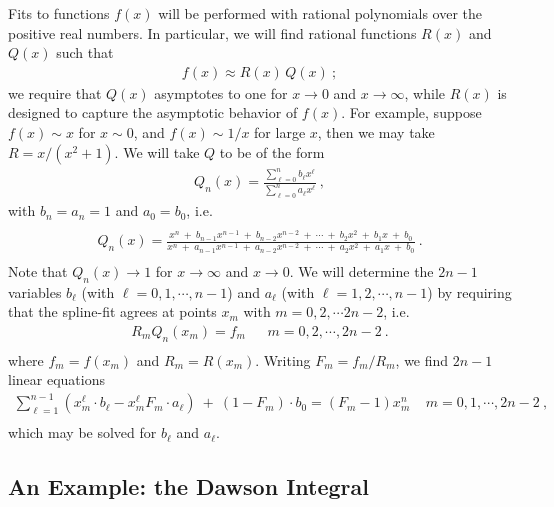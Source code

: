 \documentclass[preprint,12pt,eqsecnum,nofootinbib,amsmath,amssymb]{revtex4}
\begin{document}
Fits to functions $f(x)$ will be performed with rational 
polynomials over the positive real numbers. In particular, 
we will find rational functions $R(x)$ and $Q(x)$ such that
\begin{eqnarray}
  f(x) \approx R(x) \, Q(x) \ ;
\end{eqnarray}
we require that $Q(x)$ asymptotes to one for $x \to 0$ 
and $x\to\infty$, while $R(x)$ is designed to capture 
the asymptotic behavior of $f(x)$. For example, suppose 
$f(x) \sim x$ for $x \sim 0$, and $f(x) \sim 1/x$  for 
large $x$, then we may take  $R=x/(x^2 +1)$. We will take 
$Q$ to be of the form
\begin{eqnarray}
  Q_n(x) = \frac{\sum_{\ell=0}^n b_\ell x^\ell}
  {\sum_{\ell=0}^n a_\ell x^\ell} \ ,
\end{eqnarray}
with $b_n=a_n=1$ and $a_0=b_0$, i.e.
\begin{eqnarray}
\\ \nonumber
  Q_n(x) = \frac{x^n ~+~ b_{n-1} x^{n-1} ~+~ b_{n-2} 
  x^{n-2} ~+~ \cdots ~+~ b_2 x^2 ~+~ b_1 x ~+~ b_0}
  {x^n ~+~ a_{n-1} x^{n-1} ~+~ a_{n-2} 
  x^{n-2} ~+~ \cdots ~+~ a_2 x^2 ~+~ a_1 x ~+~ b_0} \ .
\\ \nonumber
\end{eqnarray}
Note that $Q_n(x) \to 1$ for $x\to\infty$ and $x\to 0$. 
We will determine the $2n-1$ variables $b_\ell$ (with
$\ell=0, 1, \cdots, n-1$) and $a_\ell$ (with $\ell=1, 2, 
\cdots, n-1$) by requiring that the spline-fit agrees
at points $x_m$ with $m=0, 2, \cdots 2n-2$, i.e.
\begin{eqnarray}
  R_m Q_n(x_m) = f_m ~~~~~~~ m=0, 2, \cdots, 2n-2 \ .
\\ \nonumber
\end{eqnarray}
where $f_m=f(x_m)$ and $R_m = R(x_m)$. Writing $F_m=f_m/
R_m$, we find $2n-1$ linear equations
\begin{eqnarray}
  \sum_{\ell=1}^{n-1}\left(x_m^\ell \cdot b_\ell - x_m^\ell
  F_m \cdot a_\ell \right)~+~ (1-F_m) \cdot b_0 = (F_m-1) 
  x_m^n ~~~~~ m=0,1,\cdots, 2n-2 \ ,
\\ \nonumber
\end{eqnarray}
which may be solved for $b_\ell$ and $a_\ell$. 



\subsection{An Example: the Dawson Integral}
\end{document}
